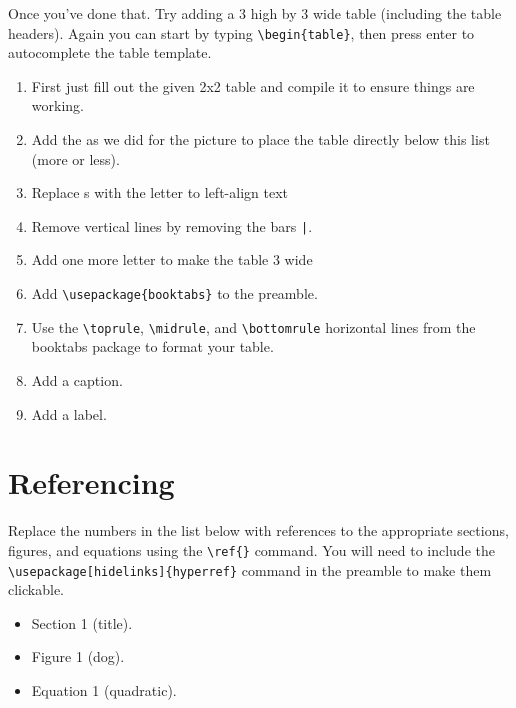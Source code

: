 
        Once you've done that. Try adding a 3 high by 3 wide table (including the table headers). Again you can start by typing
        \verb"\begin{table}", then press enter to autocomplete the table template.
        \begin{enumerate}
            \item First just fill out the given 2x2 table and compile it to ensure things are working.
            \item Add the  as we did for the picture to place the table directly below this list (more or less).
            \item Replace s with the letter  to left-align text
            \item Remove vertical lines by removing the bars \verb"|".
            \item Add one more letter  to make the table 3 wide
            \item Add \verb"\usepackage{booktabs}" to the preamble.
            \item Use the \verb"\toprule", \verb"\midrule", and \verb"\bottomrule" horizontal lines from the booktabs package to format your table.
            \item Add a caption.
            \item Add a label.
        \end{enumerate}


    \section{Referencing}
        Replace the numbers in the list below with references to the appropriate sections, figures, and equations using the \verb"\ref{}" command. You will need to include the \verb"\usepackage[hidelinks]{hyperref}" command in the preamble to make them clickable.


        \begin{itemize}
            \item Section 1 (title).
            \item Figure 1 (dog).
            \item Equation 1 (quadratic).
        \end{itemize}
        

        

        
        
    


